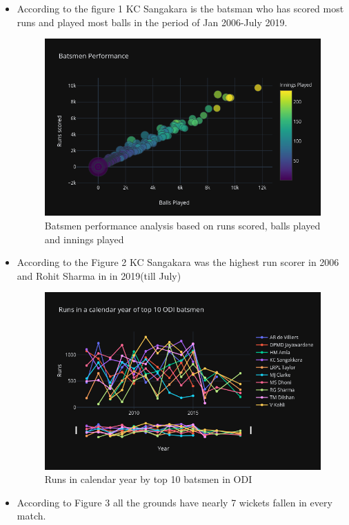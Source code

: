 \documentclass[fleqn,10pt]{wlscirep}
\begin{document}
\begin{itemize}
    \item According to the figure 1 KC Sangakara is the batsman who has scored most runs and played most balls in the period of Jan 2006-July 2019.
    \begin{figure}[h!]
        \centering
        \includegraphics[width=1\textwidth]{bats.png}
        \caption{Batsmen performance analysis based on runs scored, balls played and innings played}
      \end{figure}
      \item According to the Figure 2 KC Sangakara was the highest run scorer in 2006 and Rohit Sharma in in 2019(till July)
      \begin{figure}[h!]
        \centering
        \includegraphics[width=1\textwidth]{batsmen.png}
        \caption{Runs in calendar year by top 10 batsmen in ODI}
      \end{figure}
      \item According to Figure 3 all the grounds have nearly 7 wickets fallen in every match.

\end{itemize}
\end{document}
